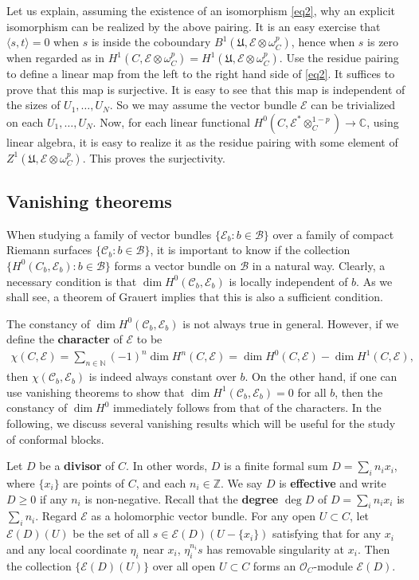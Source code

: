 \documentclass[12pt,a4paper,notitlepage]{report}
\theoremstyle{definition}
\theoremstyle{plain}
\newcommand{\fk}{\mathfrak}
\newcommand{\mc}{\mathcal}
\newcommand{\bk}[1]{\langle {#1}\rangle}
\newcommand{\scr}{\mathscr}
\newcommand{\Cbb}{\mathbb C}
\numberwithin{equation}{section}
\begin{document}
Let us explain, assuming the existence of an isomorphism \eqref{eq2}, why an explicit isomorphism can be realized by the above pairing. It is an easy exercise that $\bk{s,t}=0$ when $s$ is inside the coboundary $B^1(\fk U,\scr E\otimes \omega_C^p)$, hence when $s$ is zero when regarded as in $H^1(C,\scr E\otimes \omega_C^p)=H^1(\fk U,\scr E\otimes \omega_C^p)$. Use the residue pairing to define a linear map from the left to the right hand side of \eqref{eq2}. It suffices to prove that this map is surjective.  It is easy to see that this map is independent of the sizes of $U_1,\dots,U_N$. So we may assume the vector bundle $\scr E$ can be trivialized on each $U_1,\dots,U_N$. Now, for each linear functional $H^0(C,\scr E^*\otimes_C^{1-p})\rightarrow\Cbb$,  using linear algebra, it is easy to realize it as the residue pairing with some element of $Z^1(\fk U,\scr E\otimes\omega_C^p)$. This proves the surjectivity. 


\subsection*{Vanishing theorems} 



When studying a family of vector bundles $\{\scr E_b:b\in\mc B \}$ over a family of compact Riemann surfaces $\{\mc C_b:b\in\mc B \}$, it is important to know if the collection $\{H^0(C_b,\scr E_b):b\in\mc B\}$ forms a vector bundle on $\mc B$ in a natural way.  Clearly, a necessary condition is that  $\dim H^0(\mc C_b,\scr E_b)$ is locally independent of $b$. As we shall see, a theorem of Grauert implies that this is also a sufficient condition.

The constancy of $\dim H^0(\mc C_b,\scr E_b)$ is not always true in general. However, if we define the \textbf{character} of $\scr E$ to be \index{zz@$\chi(C,\scr E)$}
\begin{align}
\chi(C,\scr E)=\sum_{n\in\mathbb N}(-1)^n\dim H^n(C,\scr E)=\dim H^0(C,\scr E)-\dim H^1(C,\scr E),\label{eq13}
\end{align}
then $\chi(\mc C_b,\scr E_b)$ is indeed always constant over $b$. On the other hand, if one can use vanishing theorems to show that $\dim H^1(\mc C_b,\scr E_b)=0$ for all $b$, then the constancy of $\dim H^0$ immediately follows from that of the characters. In the following, we discuss several vanishing results which will be useful for the study of conformal blocks.

Let $D$ be a \textbf{divisor} of $C$. In other words, $D$ is a finite formal sum $D=\sum_i n_ix_i$, where $\{x_i\}$ are  points of $C$, and each $n_i\in\mathbb Z$. We say $D$ is \textbf{effective} and write $D\geq 0$ if any $n_i$ is non-negative.  Recall that the \textbf{degree} $\deg D$ of $D=\sum_i n_ix_i$ is $\sum_i n_i$.    Regard $\scr E$ as a holomorphic vector bundle. For any open $U\subset C$, let $\scr E(D)(U)$ be the set of all $s\in \scr E(D)(U-\{x_i\})$  satisfying that for any $x_i$ and any local coordinate $\eta_i$ near $x_i$, $\eta_i^{n_i}s$ has removable singularity at $x_i$. Then the collection $\{\scr E(D)(U) \}$ over all open $U\subset C$ forms an $\scr O_C$-module $\scr E(D)$. \index{ED@$\scr E(D),\scr O_C(D)$}
\end{document}
